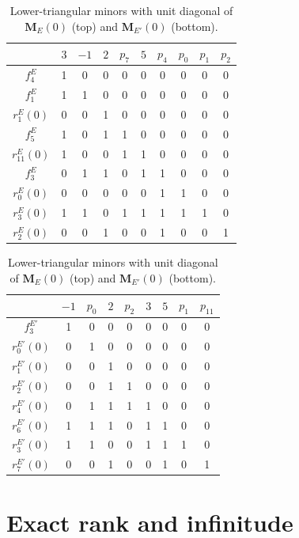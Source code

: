 \documentclass[12pt,oneside,openany]{book}
\theoremstyle{definition}
\theoremstyle{plain}
\numberwithin{equation}{chapter}
\theoremstyle{plain}
\theoremstyle{definition}
\theoremstyle{remark}
\begin{document}
\begin{table}[htbp]
\centering
\caption{Lower-triangular minors with unit diagonal of $\mathbf M_E(0)$ (top) and $\mathbf M_{E'}(0)$ (bottom).}\label{tab:r5-minors}
\renewcommand{\arraystretch}{1.15}
\begin{tabular}{c|ccccccccc}
& $3$ & $-1$ & $2$ & $p_7$ & $5$ & $p_4$ & $p_0$ & $p_1$ & $p_2$\\
\hline
$f^{E}_4$ & 1 & 0 & 0 & 0 & 0 & 0 & 0 & 0 & 0\\
$f^{E}_1$ & 1 & 1 & 0 & 0 & 0 & 0 & 0 & 0 & 0\\
$r^{E}_1(0)$ & 0 & 0 & 1 & 0 & 0 & 0 & 0 & 0 & 0\\
$f^{E}_5$ & 1 & 0 & 1 & 1 & 0 & 0 & 0 & 0 & 0\\
$r^{E}_{11}(0)$ & 1 & 0 & 0 & 1 & 1 & 0 & 0 & 0 & 0\\
$f^{E}_3$ & 0 & 1 & 1 & 0 & 1 & 1 & 0 & 0 & 0\\
$r^{E}_0(0)$ & 0 & 0 & 0 & 0 & 0 & 1 & 1 & 0 & 0\\
$r^{E}_3(0)$ & 1 & 1 & 0 & 1 & 1 & 1 & 1 & 1 & 0\\
$r^{E}_2(0)$ & 0 & 0 & 1 & 0 & 0 & 1 & 0 & 0 & 1\\
\end{tabular}

\medskip
\begin{tabular}{c|cccccccc}
& $-1$ & $p_0$ & $2$ & $p_2$ & $3$ & $5$ & $p_1$ & $p_{11}$\\
\hline
$f^{E'}_3$ & 1 & 0 & 0 & 0 & 0 & 0 & 0 & 0\\
$r^{E'}_0(0)$ & 0 & 1 & 0 & 0 & 0 & 0 & 0 & 0\\
$r^{E'}_1(0)$ & 0 & 0 & 1 & 0 & 0 & 0 & 0 & 0\\
$r^{E'}_2(0)$ & 0 & 0 & 1 & 1 & 0 & 0 & 0 & 0\\
$r^{E'}_4(0)$ & 0 & 1 & 1 & 1 & 1 & 0 & 0 & 0\\
$r^{E'}_6(0)$ & 1 & 1 & 1 & 0 & 1 & 1 & 0 & 0\\
$r^{E'}_3(0)$ & 1 & 1 & 0 & 0 & 1 & 1 & 1 & 0\\
$r^{E'}_7(0)$ & 0 & 0 & 1 & 0 & 0 & 1 & 0 & 1\\
\end{tabular}
\end{table}

\section{Exact rank and infinitude}\label{sec:r5-theorem}
\end{document}
